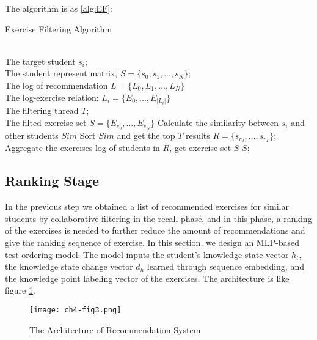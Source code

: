 The algorithm is as \ref{alg:EF}:
\begin{algorithm}[h]
  \caption{Exercise Filtering Algorithm}
  \label{alg:EF}
  \begin{algorithmic}
    \REQUIRE ~~\\
    The target student $s_i$; \\
    The student represent matrix, $S=\{s_0,s_1,...,s_N\}$;\\
    The log of recommendation $L=\{L_0,L_1,...,L_N\}$ \\
    The log-exercise relation: $L_i=\{E_0,...,E_{|L_i|}\}$\\
    The filtering thread $T$;
    \ENSURE ~~\\ %
    The filted exercise set \(S=\{E_{s_0},...,E_{s_N}\}\)
    \STATE Calculate the similarity between $s_i$ and other students $Sim$
    \STATE Sort $Sim$ and get the top $T$ results $R=\{s_{r_0},...,s_{r_T}\}$;
    \STATE Aggregate the exercises log of students in $R$, get exercise set $S$
    \RETURN $S$; %
  \end{algorithmic}
\end{algorithm}




\subsection{Ranking Stage}

In the previous step we obtained a list of recommended exercises for similar students by collaborative filtering in the recall phase, and in this phase, a ranking of the exercises is needed to further reduce the amount of recommendations and give the ranking sequence of exercise. In this section, we design an MLP-based test ordering model. The model inputs the student's knowledge state vector $h_t$, the knowledge state change vector $d_h$ learned through sequence embedding, and the knowledge point labeling vector of the exercises. The architecture is like figure \ref{fig:ch4-fig3}.


\begin{figure}[h]
  \centering
  \texttt{[image: ch4-fig3.png]}
  \caption{The Architecture of Recommendation System}
  \label{fig:ch4-fig3}
\end{figure}

